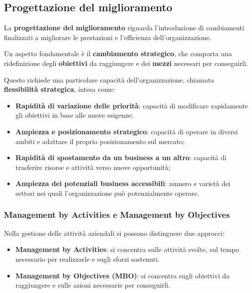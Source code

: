 \subsection{Progettazione del miglioramento}

\noindent La \textbf{progettazione del miglioramento} riguarda l'introduzione di cambiamenti finalizzati a migliorare le prestazioni e l'efficienza dell'organizzazione.

\medskip

\noindent Un aspetto fondamentale è il \textbf{cambiamento strategico}, che comporta una ridefinizione degli \textbf{obiettivi} da raggiungere e dei \textbf{mezzi} necessari per conseguirli.

\medskip

\noindent Questo richiede una particolare capacità dell'organizzazione, chiamata \textbf{flessibilità strategica}, intesa come:

\begin{itemize}
    \item \textbf{Rapidità di variazione delle priorità}: capacità di modificare rapidamente gli obiettivi in base alle nuove esigenze;

    \item \textbf{Ampiezza e posizionamento strategico}: capacità di operare in diversi ambiti e adattare il proprio posizionamento sul mercato;

    \item \textbf{Rapidità di spostamento da un business a un altro}: capacità di trasferire risorse e attività verso nuove opportunità;

    \item \textbf{Ampiezza dei potenziali business accessibili}: numero e varietà dei settori nei quali l'organizzazione può potenzialmente operare.
\end{itemize}

\subsubsection*{Management by Activities e Management by Objectives}

\noindent Nella gestione delle attività aziendali si possono distinguere due approcci:

\begin{itemize}
    \item \textbf{Management by Activities}: si concentra sulle attività svolte, sul tempo necessario per realizzarle e sugli sforzi sostenuti.

    \item \textbf{Management by Objectives (MBO)}: si concentra sugli obiettivi da raggiungere e sulle azioni necessarie per conseguirli.
\end{itemize}

